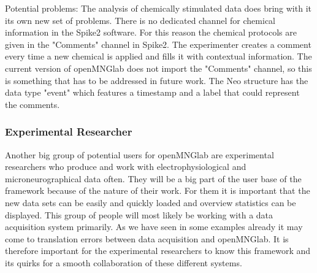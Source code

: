Potential problems: The analysis of chemically stimulated data does bring with it its own new set of problems. There is no dedicated channel for chemical information in the Spike2 software. For this reason the chemical protocols are given in the "Comments" channel in Spike2. The experimenter creates a comment every time a new chemical is applied and fills it with contextual information. The current version of openMNGlab does not import the "Comments" channel, so this is something that has to be addressed in future work. The Neo structure has the data type "event" which features a timestamp and a label that could represent the comments.

\subsubsection{Experimental Researcher}
Another big group of potential users for openMNGlab are experimental researchers who produce and work with electrophysiological and microneurographical data often. They will be a big part of the user base of the framework because of the nature of their work. For them it is important that the new data sets can be easily and quickly loaded and overview statistics can be displayed. This group of people will most likely be working with a data acquisition system primarily. As we have seen in some examples already it may come to translation errors between data acquisition and openMNGlab. It is therefore important for the experimental researchers to know this framework and its quirks for a smooth collaboration of these different systems.

